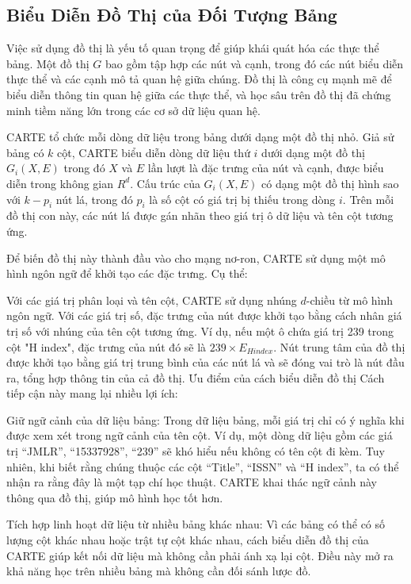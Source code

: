 \documentclass{article}
\begin{document}
\subsection{Biểu Diễn Đồ Thị của Đối Tượng Bảng}
Việc sử dụng đồ thị là yếu tố quan trọng để giúp khái quát hóa các thực thể bảng. Một đồ thị 
$G$ bao gồm tập hợp các nút và cạnh, trong đó các nút biểu diễn thực thể và các cạnh mô tả quan hệ giữa chúng. Đồ thị là công cụ mạnh mẽ để biểu diễn thông tin quan hệ giữa các thực thể, và học sâu trên đồ thị đã chứng minh tiềm năng lớn trong các cơ sở dữ liệu quan hệ.

CARTE tổ chức mỗi dòng dữ liệu trong bảng dưới dạng một đồ thị nhỏ. Giả sử bảng có $k$ cột, CARTE biểu diễn dòng dữ liệu thứ $i$ dưới dạng một đồ thị $G_i(X,E)$ trong đó $X$ và $E$ lần lượt là đặc trưng của nút và cạnh, được biểu diễn trong không gian $R^d$. Cấu trúc của $G_i(X,E)$ có dạng một đồ thị hình sao với $k-p_i$ nút lá, trong đó $p_i$ là số cột có giá trị bị thiếu trong dòng $i$. Trên mỗi đồ thị con này, các nút lá được gán nhãn theo giá trị ô dữ liệu và tên cột tương ứng.

Để biến đồ thị này thành đầu vào cho mạng nơ-ron, CARTE sử dụng một mô hình ngôn ngữ để khởi tạo các đặc trưng. Cụ thể:

Với các giá trị phân loại và tên cột, CARTE sử dụng nhúng $d$-chiều từ mô hình ngôn ngữ.
Với các giá trị số, đặc trưng của nút được khởi tạo bằng cách nhân giá trị số với nhúng của tên cột tương ứng. Ví dụ, nếu một ô chứa giá trị 239 trong cột "H index", đặc trưng của nút đó sẽ là 
$239 \times E_{H index}$.
Nút trung tâm của đồ thị được khởi tạo bằng giá trị trung bình của các nút lá và sẽ đóng vai trò là nút đầu ra, tổng hợp thông tin của cả đồ thị.
Ưu điểm của cách biểu diễn đồ thị
Cách tiếp cận này mang lại nhiều lợi ích:

Giữ ngữ cảnh của dữ liệu bảng: Trong dữ liệu bảng, mỗi giá trị chỉ có ý nghĩa khi được xem xét trong ngữ cảnh của tên cột. Ví dụ, một dòng dữ liệu gồm các giá trị “JMLR”, “15337928”, “239” sẽ khó hiểu nếu không có tên cột đi kèm. Tuy nhiên, khi biết rằng chúng thuộc các cột “Title”, “ISSN” và “H index”, ta có thể nhận ra rằng đây là một tạp chí học thuật. CARTE khai thác ngữ cảnh này thông qua đồ thị, giúp mô hình học tốt hơn.

Tích hợp linh hoạt dữ liệu từ nhiều bảng khác nhau: Vì các bảng có thể có số lượng cột khác nhau hoặc trật tự cột khác nhau, cách biểu diễn đồ thị của CARTE giúp kết nối dữ liệu mà không cần phải ánh xạ lại cột. Điều này mở ra khả năng học trên nhiều bảng mà không cần đối sánh lược đồ.
\end{document}
